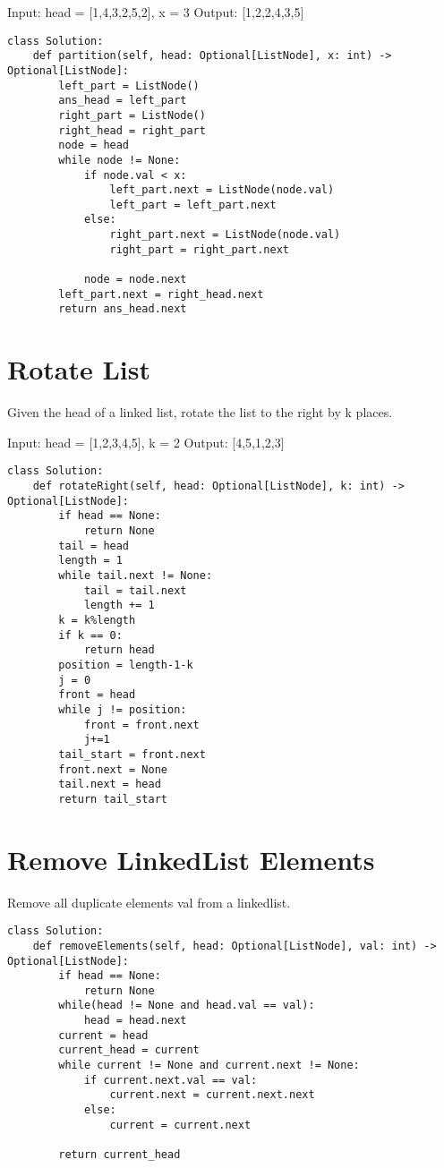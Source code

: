 \documentclass[24pt, a4]{article}
\begin{document}
Input: head = [1,4,3,2,5,2], x = 3
Output: [1,2,2,4,3,5]
\begin{lstlisting}
class Solution:
    def partition(self, head: Optional[ListNode], x: int) -> Optional[ListNode]:
        left_part = ListNode()
        ans_head = left_part
        right_part = ListNode()
        right_head = right_part
        node = head
        while node != None:
            if node.val < x:
                left_part.next = ListNode(node.val)
                left_part = left_part.next
            else:
                right_part.next = ListNode(node.val)
                right_part = right_part.next
            
            node = node.next
        left_part.next = right_head.next
        return ans_head.next
\end{lstlisting}


\section{Rotate List}
Given the head of a linked list, rotate the list to the right by k places.

Input: head = [1,2,3,4,5], k = 2
Output: [4,5,1,2,3]

\begin{lstlisting}
class Solution:
    def rotateRight(self, head: Optional[ListNode], k: int) -> Optional[ListNode]:
        if head == None:
            return None
        tail = head
        length = 1
        while tail.next != None:
            tail = tail.next
            length += 1
        k = k%length
        if k == 0:
            return head
        position = length-1-k
        j = 0
        front = head
        while j != position:
            front = front.next
            j+=1
        tail_start = front.next
        front.next = None
        tail.next = head
        return tail_start
\end{lstlisting}

\section{Remove LinkedList Elements}
Remove all duplicate elements val from a linkedlist.
\begin{lstlisting}
class Solution:
    def removeElements(self, head: Optional[ListNode], val: int) -> Optional[ListNode]:
        if head == None:
            return None
        while(head != None and head.val == val):
            head = head.next
        current = head
        current_head = current
        while current != None and current.next != None:            
            if current.next.val == val:
                current.next = current.next.next
            else:
                current = current.next
                    
        return current_head
\end{lstlisting}
\end{document}
